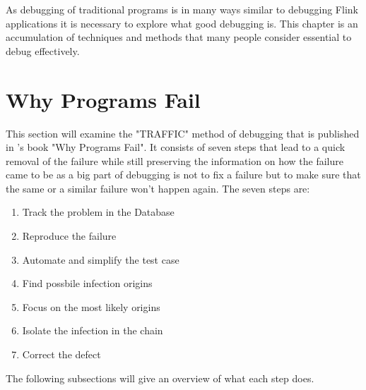 As debugging of traditional programs is in many ways similar to debugging Flink applications it is necessary to explore what good debugging is. This chapter is an accumulation of techniques and methods that many people consider essential to debug effectively.

\section{Why Programs Fail}
This section will examine the "TRAFFIC" method of debugging that is published in \cite{Zeller:2009:WPF:1718010}'s book "Why Programs Fail". It consists of seven steps that lead to a quick removal of the failure while still preserving the information on how the failure came to be as a big part of debugging is not to fix a failure but to make sure that the same or a similar failure won't happen again.
The seven steps are:
\begin{enumerate}
  \item Track the problem in the Database
  \item Reproduce the failure
  \item Automate and simplify the test case
  \item Find possbile infection origins
  \item Focus on the most likely origins
  \item Isolate the infection in the chain
  \item Correct the defect
\end{enumerate}

The following subsections will give an overview of what each step does.


